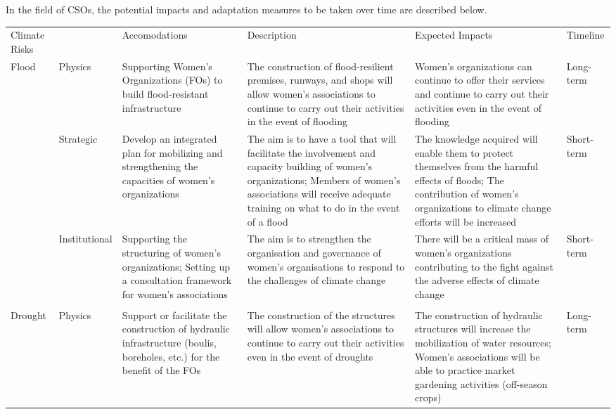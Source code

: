 \documentclass[
]{book}
\begin{document}
In the field of CSOs, the potential impacts and adaptation measures to be taken over time are described below.

\begin{tabular}{>{\raggedright\arraybackslash}p{30em}|>{\raggedright\arraybackslash}p{30em}|>{\raggedright\arraybackslash}p{30em}|>{\raggedright\arraybackslash}p{30em}|>{\raggedright\arraybackslash}p{30em}|>{\raggedright\arraybackslash}p{30em}}
\hline
\multicolumn{6}{c}{Table 14 : Synthesis of adaptation measures and their impacts in the theme of civil society organizations} \\
\cline{1-6}
Climate Risks &   & Accomodations & Description & Expected Impacts & Timeline\\
\hline
Flood & Physics & Supporting Women's Organizations (FOs) to build flood-resistant infrastructure & The construction of flood-resilient premises, runways, and shops will allow women's associations to continue to carry out their activities in the event of flooding & Women's organizations can continue to offer their services and continue to carry out their activities even in the event of flooding & Long-term\\
\hline
 & Strategic & Develop an integrated plan for mobilizing and strengthening the capacities of women's organizations & The aim is to have a tool that will facilitate the involvement and capacity building of women's organizations;                                           Members of women's associations will receive adequate training on what to do in the event of a flood & The knowledge acquired will enable them to protect themselves from the harmful effects of floods;                  The contribution of women's organizations to climate change efforts will be increased & Short-term\\
\hline
 & Institutional & Supporting the structuring of women's organizations;                              Setting up a consultation framework for women's associations & The aim is to strengthen the organisation and governance of women's organisations to respond to the challenges of climate change & There will be a critical mass of women's organizations contributing to the fight against the adverse effects of climate change & Short-term\\
\hline
 &  &  &  &  \vphantom{1} & \\
\hline
Drought & Physics & Support or facilitate the construction of hydraulic infrastructure (boulis, boreholes, etc.) for the benefit of the FOs & The construction of the structures will allow women's associations to continue to carry out their activities even in the event of droughts & The construction of hydraulic structures will increase the mobilization of water resources;                                Women's associations will be able to practice market gardening activities (off-season crops) & Long-term\\

\end{tabular}
\end{document}
